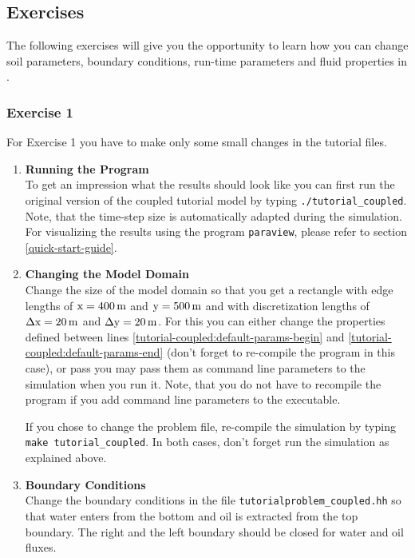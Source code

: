 \subsection{Exercises}
\label{tutorial-coupled:exercises}
The following exercises will give you the opportunity to learn how you
can change soil parameters, boundary conditions, run-time parameters
and fluid properties in \eWoms.

\subsubsection{Exercise 1}
\renewcommand{\labelenumi}{\alph{enumi})} For Exercise 1 you have
to make only some small changes in the tutorial files.  

\begin{enumerate}

\item \textbf{Running the Program} \\
  To get an impression what the results should look like you can first run the original version of 
the coupled tutorial model by typing  \texttt{./tutorial\_coupled}. 
Note, that the time-step size is automatically adapted during the simulation. 
For visualizing the results using the program \texttt{paraview}, please refer to section \ref{quick-start-guide}.

\item \textbf{Changing the Model Domain} \\
  Change the size of the model domain so that you get a rectangle with
  edge lengths of $\text{x} = \unit[400]{m}$ and $\text{y} =
  \unit[500]{m}$ and with discretization lengths of $\Delta \text{x} =
  \unit[20]{m}$ and $\Delta \text{y} = \unit[20]{m}$. For this you can
  either change the properties defined between lines
  \ref{tutorial-coupled:default-params-begin} and
  \ref{tutorial-coupled:default-params-end} (don't forget to
  re-compile the program in this case), or pass you may pass them as
  command line parameters to the simulation when you run it.  Note,
  that you do not have to recompile the program if you add command
  line parameters to the executable.

  If you chose to change the problem file, re-compile the simulation
  by typing \texttt{make tutorial\_coupled}. In both cases, don't
  forget run the simulation as explained above.
  
\item \textbf{Boundary Conditions} \\
  Change the boundary conditions in the file
  \texttt{tutorialproblem\_coupled.hh} so that water enters from the
  bottom and oil is extracted from the top boundary. The right and the
  left boundary should be closed for water and oil fluxes. 


\end{enumerate}
